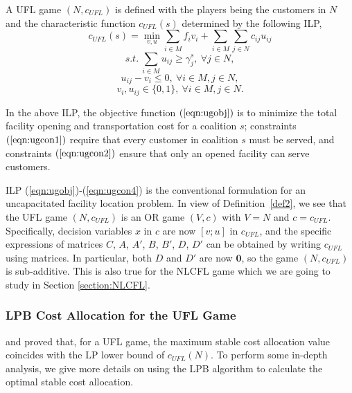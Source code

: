 \documentclass[ijoc,nonblindrev]{informs3} %
\begin{document}
\begin{definition}\label{defi:ug}
A UFL game $(N,c_{UFL})$ is defined with the players being the customers in $N$ and the characteristic function  $c_{UFL}(s)$ determined by  the following ILP,
\begin{equation}\label{eqn:ugobj}
c_{UFL}(s) = \min_{v,u} \sum_{i \in M} f_iv_i + \sum_{i \in M} \sum_{j \in N} c_{ij}u_{ij}
\end{equation}
\begin{equation} \label{eqn:ugcon1}
s.t.~\sum_{i \in M} u_{ij} \geq \gamma_j^s, ~\forall j \in N,
\end{equation}
\begin{equation}\label{eqn:ugcon2}
u_{ij} - v_i \leq 0, ~\forall i \in M, j \in N,
\end{equation}
\begin{equation}\label{eqn:ugcon4}
v_i, u_{ij} \in \{0,1\}, ~\forall i \in M, j \in N.
\end{equation}
\end{definition}


In the above ILP, the objective function $(\ref{eqn:ugobj})$ is to minimize the  total facility opening and transportation cost for a coalition $s$; constraints $(\ref{eqn:ugcon1})$ require that every customer in coalition $s$ must be served, and constraints $(\ref{eqn:ugcon2})$ ensure that only an opened facility can  serve customers.


ILP (\ref{eqn:ugobj})-(\ref{eqn:ugcon4}) is the conventional formulation for an uncapacitated facility location problem. In view of Definition~\ref{def2}, we see that  the UFL game $ (N,c_{UFL})$ is an OR game $(V,c)$ with $V=N$ and $c = c_{UFL}$. Specifically, decision variables $x$ in $c$ are now $[v;u]$ in $c_{UFL}$, and the specific expressions of matrices $C$, $A$, $A'$, $B$, $B'$, $D$, $D'$ can be obtained by writing $c_{UFL}$ using matrices. In particular,
both $D$ and $D'$ are now $\textbf{0}$, so the game $ (N,c_{UFL})$ is sub-additive. This is also true for the NLCFL game which we are going to study in Section \ref{section:NLCFL}.


\subsubsection{LPB Cost Allocation for the UFL Game}\label{section:LPBUFL}
\cite{Kolen1983FacilityLocationGame} and \cite{Goemans2000FacilityLocationGames} proved that, for a UFL game, the maximum stable cost allocation value coincides with the LP lower bound of $c_{UFL}(N)$. To perform some in-depth analysis, we give more details on  using the LPB algorithm to calculate the optimal stable cost allocation.
\end{document}
